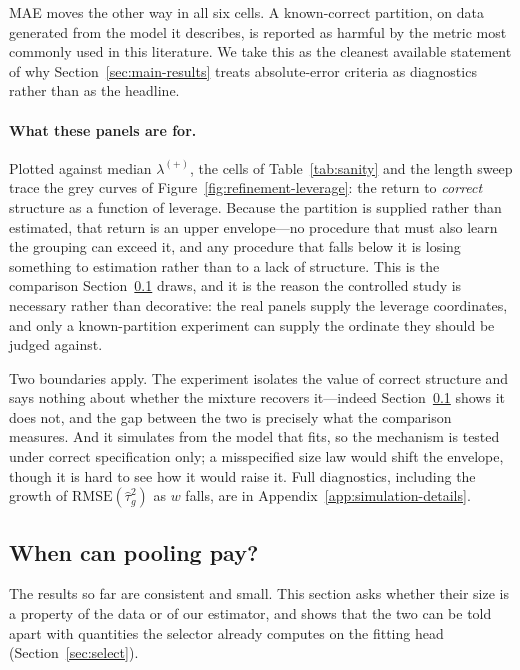 MAE moves the other way in all six cells. A known-correct partition, on
data generated from the model it describes, is reported as harmful by the
metric most commonly used in this literature. We take this as the cleanest
available statement of why Section~\ref{sec:main-results} treats
absolute-error criteria as diagnostics rather than as the headline.

\paragraph{What these panels are for.}
Plotted against median $\lambda^{(+)}$, the cells of
Table~\ref{tab:sanity} and the length sweep trace the grey curves of
Figure~\ref{fig:refinement-leverage}: the return to \emph{correct}
structure as a function of leverage. Because the partition is supplied
rather than estimated, that return is an upper envelope---no procedure
that must also learn the grouping can exceed it, and any procedure that
falls below it is losing something to estimation rather than to a lack of
structure. This is the comparison Section~\ref{sec:leverage} draws, and it
is the reason the controlled study is necessary rather than decorative:
the real panels supply the leverage coordinates, and only a known-partition
experiment can supply the ordinate they should be judged against.

Two boundaries apply. The experiment isolates the value of correct
structure and says nothing about whether the mixture recovers it---indeed
Section~\ref{sec:leverage} shows it does not, and the gap between the two
is precisely what the comparison measures. And it simulates from the model
that \REMIX{} fits, so the mechanism is tested under correct specification
only; a misspecified size law would shift the envelope, though it is hard
to see how it would raise it. Full diagnostics, including the growth of
$\mathrm{RMSE}(\hat\tau_g^2)$ as $w$ falls, are in
Appendix~\ref{app:simulation-details}.

\subsection{When can pooling pay?}\label{sec:leverage}

The results so far are consistent and small. This section asks whether
their size is a property of the data or of our estimator, and shows that
the two can be told apart with quantities the selector already computes on
the fitting head (Section~\ref{sec:select}).

